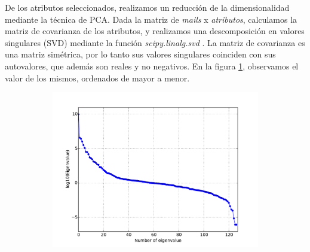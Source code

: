\documentclass[a4paper,10pt]{article}
\begin{document}
\par De los atributos seleccionados, realizamos un reducción de la dimensionalidad
mediante la técnica de PCA. Dada la matriz de \emph{mails} x \emph{atributos},
calculamos la matriz de covarianza de los atributos, y realizamos una descomposición en valores singulares (SVD) mediante la funci\'on \emph{scipy.linalg.svd} \cite{scipy}. La matriz de covarianza es una matriz simétrica, por lo tanto sus valores singulares coinciden con sus autovalores, que además son reales y no negativos. En la figura \ref{fig:autovalores}, observamos el valor de los mismos, ordenados de mayor a menor. 
  \begin{figure}[H]
    \centering
    \begin{subfigure}[b]{0.4\textwidth}
      \includegraphics[width=\textwidth]{../imagenes/Autovalores}
    \end{subfigure}
    \caption{}
    \label{fig:autovalores}
  \end{figure}
\end{document}
